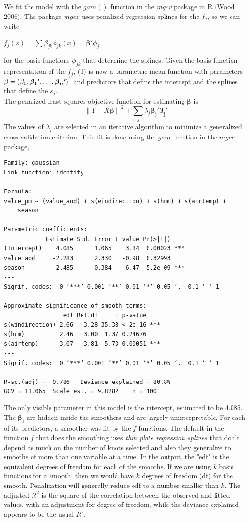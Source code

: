 \documentclass[10pt]{article}
\begin{document}
We fit the model with the $gam()$ function in the {\textit{mgcv}} package in R (Wood 2006). The package ${mgcv}$ uses penalized regression splines for the $f_{j}$, so we can write
\begin{center} 
$f_{j}(x) = \sum \beta_{jk} {\phi_{jk}}(x) = {\bm{\beta{'}}}{\phi_j}$
\end{center} 
for the basis functions ${\phi_{jk}}$ that determine the splines. Given the basis function representation of the $f_j$, (1) is now a parametric mean function with parameters ${\bf{\beta}} = (\beta_0, {\bm{\beta_1{'}}}, \ldots, {\bm{\beta_n{'}}})^{'}$ and predictors that define the intercept and the splines that define the $s_j$.  \\
The penalized least squares objective function for estimating ${\bm{\beta}}$ is 
\begin{equation} 
{\lVert Y - X{\bm{\beta}}\rVert}^{2} + \sum_{j}\lambda_{j}{\bm{\beta_{j}{'}}}{\bm{\beta_{j}{'}}}
\end{equation}
The values of $\lambda_{j}$ are selected in an iterative algorithm to minimize a generalized cross validation criterion. This fit is done using the ${gam}$ function in the ${mgcv}$ package, 
\begin{verbatim}
Family: gaussian 
Link function: identity 

Formula:
value_pm ~ (value_aod) + s(windirection) + s(hum) + s(airtemp) + 
    season

Parametric coefficients:
            Estimate Std. Error t value Pr(>|t|)    
(Intercept)    4.085      1.065    3.84  0.00023 ***
value_aod     -2.283      2.330   -0.98  0.32993    
season         2.485      0.384    6.47  5.2e-09 ***
---
Signif. codes:  0 ‘***’ 0.001 ‘**’ 0.01 ‘*’ 0.05 ‘.’ 0.1 ‘ ’ 1

Approximate significance of smooth terms:
                 edf Ref.df     F p-value    
s(windirection) 2.66   3.28 35.38 < 2e-16 ***
s(hum)          2.46   3.00  1.37 0.24676    
s(airtemp)      3.07   3.81  5.73 0.00051 ***
---
Signif. codes:  0 ‘***’ 0.001 ‘**’ 0.01 ‘*’ 0.05 ‘.’ 0.1 ‘ ’ 1

R-sq.(adj) =  0.786   Deviance explained = 80.8%
GCV = 11.065  Scale est. = 9.8282    n = 100
\end{verbatim} 
The only visible parameter in this model is the intercept, estimated to be 4.085. The ${\bm{\beta_{j}}}$ are hidden inside the smoothers and are largely uninterpretable. For each of its predictors, a smoother was fit by the $f$ functions. The default in the function $f$ that does the smoothing uses {\textit{thin plate regression splines}} that don't depend as much on the number of knots selected and also they generalize to smooths of more than one variable at a time. In the output, the "edf" is the equivalent degrees of freedom for each of the smooths. If we are using $k$ basis functions for a smooth, then we would have $k$ degrees of freedom (df) for the smooth. Penalization will generally reduce edf to a number smaller than $k$. The adjusted $R^{2}$ is the square of the correlation between the observed and fitted values, with an adjustment for degree of freedom, while the deviance explained appears to be the usual $R^2$. 
\end{document}
